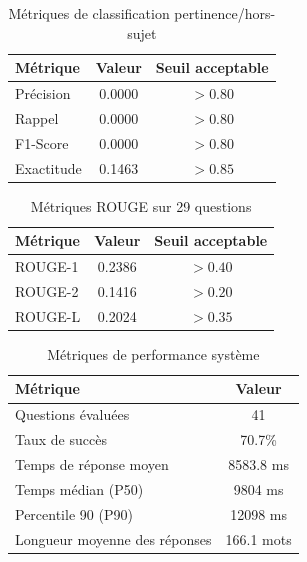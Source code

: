 
\begin{table}[h]
\centering
\caption{Métriques de classification pertinence/hors-sujet}
\label{tab:classification}
\begin{tabular}{lcc}
\hline
\textbf{Métrique} & \textbf{Valeur} & \textbf{Seuil acceptable} \\
\hline
Précision & 0.0000 & $> 0.80$ \\
Rappel & 0.0000 & $> 0.80$ \\
F1-Score & 0.0000 & $> 0.80$ \\
Exactitude & 0.1463 & $> 0.85$ \\
\hline
\end{tabular}
\end{table}

\begin{table}[h]
\centering
\caption{Métriques ROUGE sur 29 questions}
\label{tab:rouge}
\begin{tabular}{lcc}
\hline
\textbf{Métrique} & \textbf{Valeur} & \textbf{Seuil acceptable} \\
\hline
ROUGE-1 & 0.2386 & $> 0.40$ \\
ROUGE-2 & 0.1416 & $> 0.20$ \\
ROUGE-L & 0.2024 & $> 0.35$ \\
\hline
\end{tabular}
\end{table}

\begin{table}[h]
\centering
\caption{Métriques de performance système}
\label{tab:performance}
\begin{tabular}{lc}
\hline
\textbf{Métrique} & \textbf{Valeur} \\
\hline
Questions évaluées & 41 \\
Taux de succès & 70.7\% \\
Temps de réponse moyen & 8583.8 ms \\
Temps médian (P50) & 9804 ms \\
Percentile 90 (P90) & 12098 ms \\
Longueur moyenne des réponses & 166.1 mots \\
\hline
\end{tabular}
\end{table}